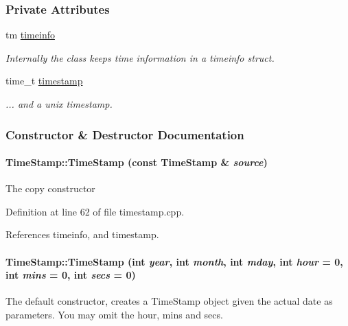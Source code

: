 \subsubsection*{Private Attributes}
\begin{CompactItemize}
\item 
tm \hyperlink{classTimeStamp_TimeStampo0}{timeinfo}
\begin{CompactList}\small\item\em Internally the class keeps time information in a timeinfo struct.\item\end{CompactList}\item 
time\_\-t \hyperlink{classTimeStamp_TimeStampo1}{timestamp}
\begin{CompactList}\small\item\em ... and a unix timestamp.\item\end{CompactList}\end{CompactItemize}


\subsubsection{Constructor \& Destructor Documentation}
\hypertarget{classTimeStamp_TimeStampa0}{
\paragraph[TimeStamp]{\setlength{\rightskip}{0pt plus 5cm}Time\-Stamp::Time\-Stamp (const Time\-Stamp \& {\em source})}\hfill}
\label{classTimeStamp_TimeStampa0}


The copy constructor 

Definition at line 62 of file timestamp.cpp.

References timeinfo, and timestamp.\hypertarget{classTimeStamp_TimeStampa1}{
\paragraph[TimeStamp]{\setlength{\rightskip}{0pt plus 5cm}Time\-Stamp::Time\-Stamp (int {\em year}, int {\em month}, int {\em mday}, int {\em hour} = 0, int {\em mins} = 0, int {\em secs} = 0)}\hfill}
\label{classTimeStamp_TimeStampa1}


The default constructor, creates a Time\-Stamp object given the actual date as parameters. You may omit the hour, mins and secs. 

